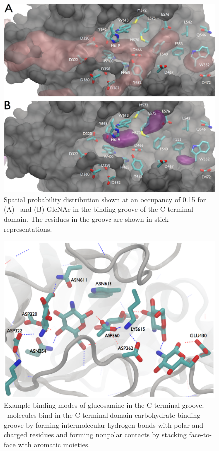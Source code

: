 {\begin{figure}[htbp]
\centering
\includegraphics[width=6.25in]{figures/results4/cterm_groove_surf3.pdf}
\caption[Spatial probability densities of GlcNAc and GlcNH3+ in the C-terminal groove]{Spatial probability distribution shown at an occupancy of 0.15 for (A) \glucosamine\ and (B) GlcNAc in the binding groove of the C-terminal domain. The residues in the groove are shown in stick representations.}
\label{fig:groove}
\end{figure}

\begin{figure}[htbp]
\centering
\includegraphics[width=6.25in]{figures/results4/glucosamine_groove_binding_modes.png}
\caption[Example of glucosamine molecules binding in the C-terminal groove] {Example binding modes of glucosamine in the C-terminal groove. \glucosamine\ molecules bind in the C-terminal domain carbohydrate-binding groove by forming intermolecular hydrogen bonds with polar and charged residues and forming nonpolar contacts by stacking face-to-face with aromatic moieties.}
\label{fig:glucosamine_binding_modes_c_term}
\end{figure}

}
